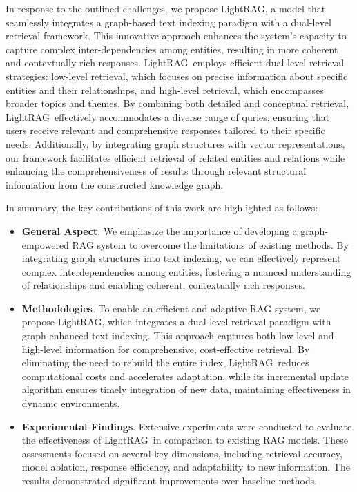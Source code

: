\documentclass{article} %
\def\model{LightRAG}
\begin{document}
In response to the outlined challenges, we propose \model, a model that seamlessly integrates a graph-based text indexing paradigm with a dual-level retrieval framework. This innovative approach enhances the system's capacity to capture complex inter-dependencies among entities, resulting in more coherent and contextually rich responses. \model\ employs efficient dual-level retrieval strategies: low-level retrieval, which focuses on precise information about specific entities and their relationships, and high-level retrieval, which encompasses broader topics and themes. By combining both detailed and conceptual retrieval, \model\ effectively accommodates a diverse range of quries, ensuring that users receive relevant and comprehensive responses tailored to their specific needs. Additionally, by integrating graph structures with vector representations, our framework facilitates efficient retrieval of related entities and relations while enhancing the comprehensiveness of results through relevant structural information from the constructed knowledge graph.

In summary, the key contributions of this work are highlighted as follows:

\begin{itemize}[leftmargin=*]

\item \textbf{General Aspect}. We emphasize the importance of developing a graph-empowered RAG system to overcome the limitations of existing methods. By integrating graph structures into text indexing, we can effectively represent complex interdependencies among entities, fostering a nuanced understanding of relationships and enabling coherent, contextually rich responses.

\item \textbf{Methodologies}. To enable an efficient and adaptive RAG system, we propose \model, which integrates a dual-level retrieval paradigm with graph-enhanced text indexing. This approach captures both low-level and high-level information for comprehensive, cost-effective retrieval. By eliminating the need to rebuild the entire index, \model\ reduces computational costs and accelerates adaptation, while its incremental update algorithm ensures timely integration of new data, maintaining effectiveness in dynamic environments.

\item \textbf{Experimental Findings}. Extensive experiments were conducted to evaluate the effectiveness of \model\ in comparison to existing RAG models. These assessments focused on several key dimensions, including retrieval accuracy, model ablation, response efficiency, and adaptability to new information. The results demonstrated significant improvements over baseline methods.

\end{itemize}
\end{document}
